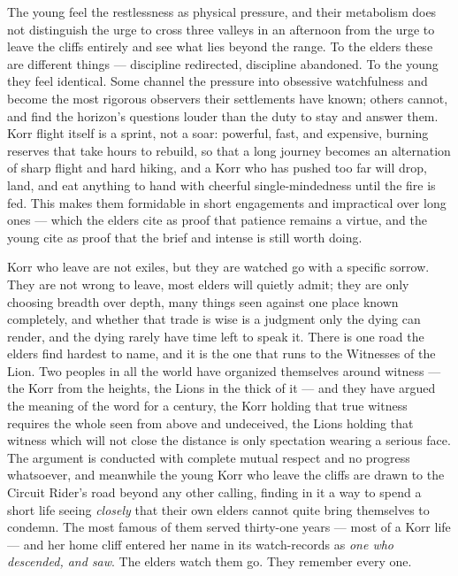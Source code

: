 The young feel the restlessness as physical pressure, and their metabolism does not distinguish the urge to cross three valleys in an afternoon from the urge to leave the cliffs entirely and see what lies beyond the range. To the elders these are different things --- discipline redirected, discipline abandoned. To the young they feel identical. Some channel the pressure into obsessive watchfulness and become the most rigorous observers their settlements have known; others cannot, and find the horizon's questions louder than the duty to stay and answer them. Korr flight itself is a sprint, not a soar: powerful, fast, and expensive, burning reserves that take hours to rebuild, so that a long journey becomes an alternation of sharp flight and hard hiking, and a Korr who has pushed too far will drop, land, and eat anything to hand with cheerful single-mindedness until the fire is fed. This makes them formidable in short engagements and impractical over long ones --- which the elders cite as proof that patience remains a virtue, and the young cite as proof that the brief and intense is still worth doing.

Korr who leave are not exiles, but they are watched go with a specific sorrow. They are not wrong to leave, most elders will quietly admit; they are only choosing breadth over depth, many things seen against one place known completely, and whether that trade is wise is a judgment only the dying can render, and the dying rarely have time left to speak it. There is one road the elders find hardest to name, and it is the one that runs to the Witnesses of the Lion. Two peoples in all the world have organized themselves around witness --- the Korr from the heights, the Lions in the thick of it --- and they have argued the meaning of the word for a century, the Korr holding that true witness requires the whole seen from above and undeceived, the Lions holding that witness which will not close the distance is only spectation wearing a serious face. The argument is conducted with complete mutual respect and no progress whatsoever, and meanwhile the young Korr who leave the cliffs are drawn to the Circuit Rider's road beyond any other calling, finding in it a way to spend a short life seeing \textit{closely} that their own elders cannot quite bring themselves to condemn. The most famous of them served thirty-one years --- most of a Korr life --- and her home cliff entered her name in its watch-records as \textit{one who descended, and saw}. The elders watch them go. They remember every one.

